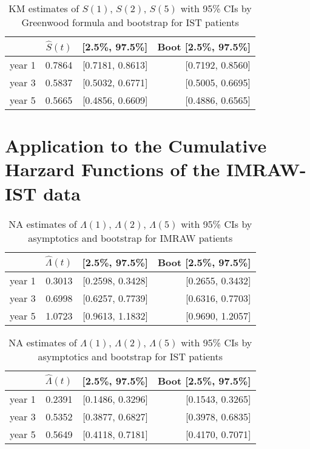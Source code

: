 \documentclass[11pt]{article}
\newcommand{\hS}{\hat{S}}
\newcommand{\hLam}{\hat{\Lambda}}
\begin{document}
\begin{table}[H]
\caption{KM estimates of $S(1)$, $S(2)$, $S(5)$
             with 95\% CIs by Greenwood formula and bootstrap for IST patients} 
\centering
\begin{tabular}{rrrr}
  \hline
  \hline
 & $\hS(t)$ & [2.5\%, 97.5\%] & Boot [2.5\%, 97.5\%] \\ 
  \hline
  year 1 & 0.7864 & [0.7181, 0.8613] & [0.7192, 0.8560] \\ 
  year 3 & 0.5837 & [0.5032, 0.6771] & [0.5005, 0.6695] \\ 
  year 5 & 0.5665 & [0.4856, 0.6609] & [0.4886, 0.6565] \\ 
   \hline
\end{tabular}
\end{table}

\section{Application to the Cumulative Harzard Functions of the IMRAW-IST data}

\begin{table}[H]
\caption{NA estimates of $\Lambda(1)$, $\Lambda(2)$, $\Lambda(5)$ 
             with 95\% CIs by asymptotics and bootstrap for IMRAW patients} 
\centering
\begin{tabular}{rrrr}
  \hline
  \hline
 & $\hLam(t)$ & [2.5\%, 97.5\%] & Boot [2.5\%, 97.5\%] \\ 
  \hline
  year 1 & 0.3013 & [0.2598, 0.3428] & [0.2655, 0.3432] \\ 
  year 3 & 0.6998 & [0.6257, 0.7739] & [0.6316, 0.7703] \\ 
  year 5 & 1.0723 & [0.9613, 1.1832] & [0.9690, 1.2057] \\ 
   \hline
\end{tabular}
\end{table}

\begin{table}[H]
\caption{NA estimates of $\Lambda(1)$, $\Lambda(2)$, $\Lambda(5)$ 
             with 95\% CIs by asymptotics and bootstrap for IST patients} 
\centering
\begin{tabular}{rrrr}
  \hline
  \hline
 & $\hLam(t)$ & [2.5\%, 97.5\%] & Boot [2.5\%, 97.5\%] \\ 
  \hline
  year 1 & 0.2391 & [0.1486, 0.3296] & [0.1543, 0.3265] \\ 
  year 3 & 0.5352 & [0.3877, 0.6827] & [0.3978, 0.6835] \\ 
  year 5 & 0.5649 & [0.4118, 0.7181] & [0.4170, 0.7071] \\ 
   \hline
\end{tabular}
\end{table}
\end{document}
